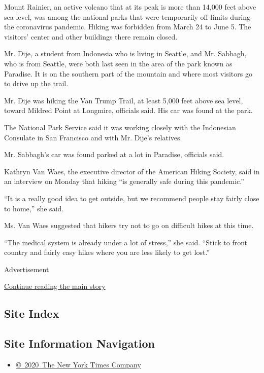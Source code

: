 Mount Rainier, an active volcano that at its peak is more than 14,000
feet above sea level, was among the national parks that were temporarily
off-limits during the coronavirus pandemic. Hiking was forbidden from
March 24 to June 5. The visitors' center and other buildings there
remain closed.

Mr. Dije, a student from Indonesia who is living in Seattle, and Mr.
Sabbagh, who is from Seattle, were both last seen in the area of the
park known as Paradise. It is on the southern part of the mountain and
where most visitors go to drive up the trail.

Mr. Dije was hiking the Van Trump Trail, at least 5,000 feet above sea
level, toward Mildred Point at Longmire, officials said. His car was
found at the park.

The National Park Service said it was working closely with the
Indonesian Consulate in San Francisco and with Mr. Dije's relatives.

Mr. Sabbagh's car was found parked at a lot in Paradise, officials said.

Kathryn Van Waes, the executive director of the American Hiking Society,
said in an interview on Monday that hiking ``is generally safe during
this pandemic.''

``It is a really good idea to get outside, but we recommend people stay
fairly close to home,'' she said.

Ms. Van Waes suggested that hikers try not to go on difficult hikes at
this time.

``The medical system is already under a lot of stress,'' she said.
``Stick to front country and fairly easy hikes where you are less likely
to get lost.''

Advertisement

\protect\hyperlink{after-bottom}{Continue reading the main story}

\hypertarget{site-index}{%
\subsection{Site Index}\label{site-index}}

\hypertarget{site-information-navigation}{%
\subsection{Site Information
Navigation}\label{site-information-navigation}}

\begin{itemize}
\tightlist
\item
  \href{https://help.nytimes.com/hc/en-us/articles/115014792127-Copyright-notice}{©~2020~The
  New York Times Company}
\end{itemize}

